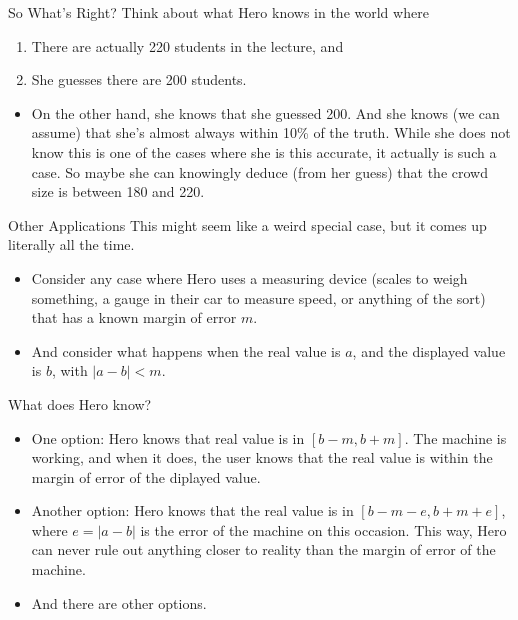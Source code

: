 \documentclass[
  14pt,
  letterpaper,
  ignorenonframetext,
]{beamer}
\providecommand{\tightlist}{%
  \setlength{\itemsep}{0pt}\setlength{\parskip}{0pt}}\usepackage{longtable,booktabs,array}
\begin{document}
\begin{frame}{So What's Right?}
\protect\hypertarget{so-whats-right-1}{}
Think about what Hero knows in the world where

\begin{enumerate}
\tightlist
\item
  There are actually 220 students in the lecture, and
\item
  She guesses there are 200 students. \pause 
\end{enumerate}

\begin{itemize}
\tightlist
\item
  On the other hand, she knows that she guessed 200. And she knows (we
  can assume) that she's almost always within 10\% of the truth. While
  she does not know this is one of the cases where she is this accurate,
  it actually is such a case. So maybe she can knowingly deduce (from
  her guess) that the crowd size is between 180 and 220.
\end{itemize}
\end{frame}

\begin{frame}{Other Applications}
\protect\hypertarget{other-applications}{}
This might seem like a weird special case, but it comes up literally all
the time.

\begin{itemize}
\tightlist
\item
  Consider any case where Hero uses a measuring device (scales to weigh
  something, a gauge in their car to measure speed, or anything of the
  sort) that has a known margin of error \(m\).
\item
  And consider what happens when the real value is \(a\), and the
  displayed value is \(b\), with \(|a - b| < m\).
\end{itemize}
\end{frame}

\begin{frame}{What does Hero know?}
\protect\hypertarget{what-does-hero-know}{}
\begin{itemize}
\tightlist
\item
  One option: Hero knows that real value is in \([b-m, b+m]\). The
  machine is working, and when it does, the user knows that the real
  value is within the margin of error of the diplayed value.
\item
  Another option: Hero knows that the real value is in
  \([b-m-e, b+m+e]\), where \(e = |a - b|\) is the error of the machine
  on this occasion. This way, Hero can never rule out anything closer to
  reality than the margin of error of the machine.
\item
  And there are other options.
\end{itemize}
\end{frame}
\end{document}
